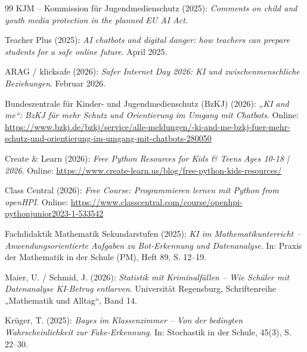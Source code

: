\documentclass[12pt,a4paper,oneside]{scrartcl}
\begin{document}
\begin{thebibliography}{99}
		KJM – Kommission für Jugendmedienschutz (2025): \emph{Comments on child and youth media protection in the planned EU AI Act}.
		
		Teacher Plus (2025): \emph{AI chatbots and digital danger: how teachers can prepare students for a safe online future}. April 2025.
		
		ARAG / klicksafe (2026): \emph{Safer Internet Day 2026: KI und zwischenmenschliche Beziehungen}. Februar 2026.
		
		Bundeszentrale für Kinder- und Jugendmedienschutz (BzKJ) (2026): \emph{„KI and me“: BzKJ für mehr Schutz und Orientierung im Umgang mit Chatbots}. Online: \url{https://www.bzkj.de/bzkj/service/alle-meldungen/-ki-and-me-bzkj-fuer-mehr-schutz-und-orientierung-im-umgang-mit-chatbots-280050}
		
		Create \& Learn (2026): \emph{Free Python Resources for Kids \& Teens Ages 10-18 | 2026}. Online: \url{https://www.create-learn.us/blog/free-python-kids-resources/}
		
		Class Central (2026): \emph{Free Course: Programmieren lernen mit Python from openHPI}. Online: \url{https://www.classcentral.com/course/openhpi-pythonjunior2023-1-533542}
		
		Fachdidaktik Mathematik Sekundarstufen (2025): \emph{KI im Mathematikunterricht – Anwendungsorientierte Aufgaben zu Bot-Erkennung und Datenanalyse}. In: Praxis der Mathematik in der Schule (PM), Heft 89, S. 12–19.
		
		Maier, U. / Schmid, J. (2026): \emph{Statistik mit Kriminalfällen – Wie Schüler mit Datenanalyse KI-Betrug entlarven}. Universität Regensburg, Schriftenreihe „Mathematik und Alltag“, Band 14.
		
		Krüger, T. (2025): \emph{Bayes im Klassenzimmer – Von der bedingten Wahrscheinlichkeit zur Fake-Erkennung}. In: Stochastik in der Schule, 45(3), S. 22–30.
		
	\end{thebibliography}
	
\end{document}
